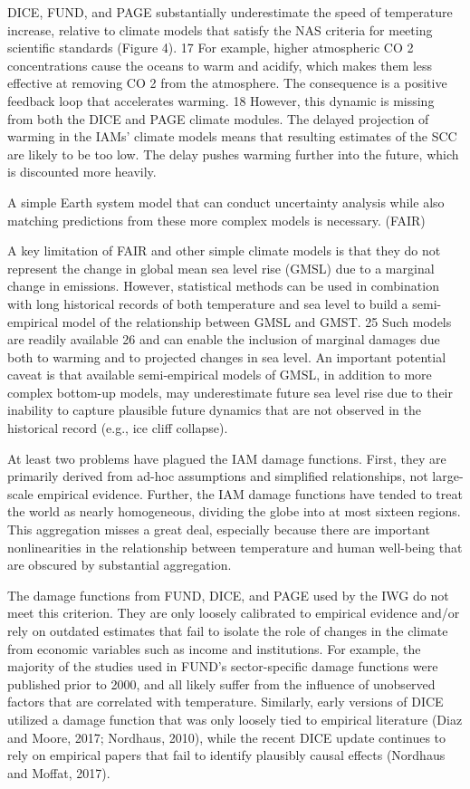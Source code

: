 \documentclass[
]{book}
\begin{document}
DICE, FUND, and PAGE substantially
underestimate the speed of temperature increase, relative to climate models that satisfy
the NAS criteria for meeting scientific standards (Figure 4). 17 For example, higher
atmospheric CO 2 concentrations cause the oceans to warm and acidify, which makes
them less effective at removing CO 2 from the atmosphere. The consequence is a positive
feedback loop that accelerates warming. 18 However, this dynamic is missing from both
the DICE and PAGE climate modules.
The delayed projection
of warming in the IAMs' climate models means that resulting estimates of the SCC are
likely to be too low. The delay pushes warming further into the future, which is
discounted more heavily.

A simple Earth system model that can conduct uncertainty analysis while also
matching predictions from these more complex models is necessary. (FAIR)

A key limitation of FAIR and other simple climate models is that they do not represent
the change in global mean sea level rise (GMSL) due to a marginal change in emissions.
However, statistical methods can be used in combination with long historical records of
both temperature and sea level to build a semi-empirical model of the relationship
between GMSL and GMST. 25 Such models are readily available 26 and can enable the
inclusion of marginal damages due both to warming and to projected changes in sea
level. An important potential caveat is that available semi-empirical models of GMSL,
in addition to more complex bottom-up models, may underestimate future sea level rise
due to their inability to capture plausible future dynamics that are not observed in the
historical record (e.g., ice cliff collapse).

At least two problems have plagued the IAM damage functions. First, they are
primarily derived from ad-hoc assumptions and simplified relationships, not large-scale
empirical evidence. Further, the IAM damage functions have tended to treat the world
as nearly homogeneous, dividing the globe into at most sixteen regions. This aggregation
misses a great deal, especially because there are important nonlinearities in the
relationship between temperature and human well-being that are obscured by
substantial aggregation.

The damage functions from FUND, DICE, and PAGE used by the IWG do not
meet this criterion. They are only loosely calibrated to empirical evidence and/or
rely on outdated estimates that fail to isolate the role of changes in the climate
from economic variables such as income and institutions. For example, the
majority of the studies used in FUND's sector-specific damage functions were
published prior to 2000, and all likely suffer from the influence of unobserved
factors that are correlated with temperature. Similarly, early versions of DICE
utilized a damage function that was only loosely tied to empirical literature (Diaz
and Moore, 2017; Nordhaus, 2010), while the recent DICE update continues to
rely on empirical papers that fail to identify plausibly causal effects (Nordhaus
and Moffat, 2017).
\end{document}
